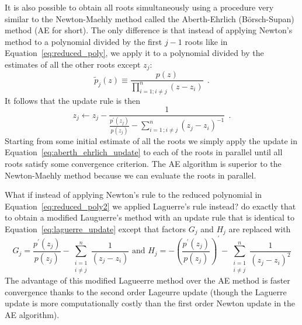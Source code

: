 \documentclass[12pt,dvipsnames]{report}
\newcommand{\ssf}[1]{\textsf{#1}}
\newcommand{\hquad}{~~}
\begin{document}
It is also possible to obtain all roots simultaneously using a procedure very similar to 
the Newton-Maehly method called the \ssf{Aberth-Ehrlich} (\ssf{B\"{o}rsch-Supan}) method 
(AE for short). The only difference is that instead of applying Newton's method to a 
polynomial divided by the first $j-1$ roots like in Equation~\ref{eq:reduced_poly}, we 
apply it to a polynomial divided by the estimates of all the other roots except $z_j$:
\begin{equation}
    \tilde{p}_{j}(z) \equiv \frac{p(z)}{\prod_{i=1;i\neq j}^{n}(z-z_i)}\hquad .
    \label{eq:reduced_poly2}
\end{equation}
It follows that the update rule is then 
\begin{equation}
    z_j \leftarrow z_j - \frac{1}{\frac{p^\prime (z_j)}{p(z_j)} - \sum_{i=1\,;i\neq j}^{n}\left(z_j-z_{i}\right)^{-1}}\hquad .
    \label{eq:aberth_ehrlich_update}
\end{equation}
Starting from some initial estimate of all the roots we simply apply the update in 
Equation~\ref{eq:aberth_ehrlich_update} to each of the roots in parallel until all 
roots satisfy some convergence criterion. The AE algorithm is superior to the Newton-Maehly
method because we can evaluate the roots in parallel.

What if instead of applying Newton's rule  to the reduced polynomial in 
Equation~\ref{eq:reduced_poly2} we applied Laguerre's rule instead?  \citet{cameron2019} 
do exactly that to obtain a modified Lauguerre's method with an update rule that is 
identical to Equation~\ref{eq:laguerre_update} except that factors $G_j$ and $H_j$ are 
replaced with
\begin{equation}
    G_{j}=\frac{p^{\prime}\left(z_{j}\right)}{p\left(z_{j}\right)}-
    \sum_{\substack{i=1 \\ i \neq j}}^{n} \frac{1}{\left(z_{j}-z_{i}\right)} \text { and } H_{j}=-\left(\frac{p^{\prime}\left(z_{j}\right)}{p\left(z_{j}\right)}\right)^{\prime}-\sum_{\substack{i=1 \\ i \neq j}}^{n} \frac{1}{\left(z_{j}-z_{i}\right)^{2}}
\end{equation}
The advantage of this modified Lagueerre method over the AE method is faster convergence 
thanks to the second order Lageurre update (though the Laguerre update is more 
computationally costly than the first order Newton update in the AE algorithm). 
\end{document}
